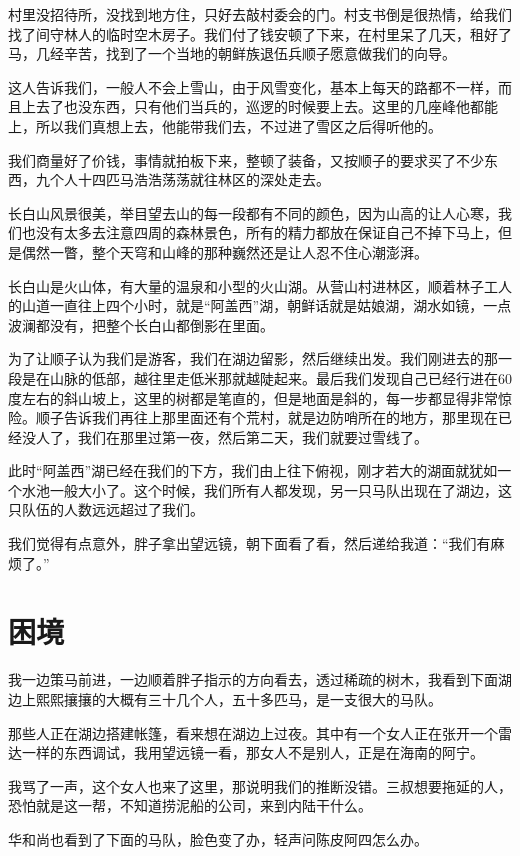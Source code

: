 村里没招待所，没找到地方住，只好去敲村委会的门。村支书倒是很热情，给我们找了间守林人的临时空木房子。我们付了钱安顿了下来，在村里呆了几天，租好了马，几经辛苦，找到了一个当地的朝鲜族退伍兵顺子愿意做我们的向导。

这人告诉我们，一般人不会上雪山，由于风雪变化，基本上每天的路都不一样，而且上去了也没东西，只有他们当兵的，巡逻的时候要上去。这里的几座峰他都能上，所以我们真想上去，他能带我们去，不过进了雪区之后得听他的。

我们商量好了价钱，事情就拍板下来，整顿了装备，又按顺子的要求买了不少东西，九个人十四匹马浩浩荡荡就往林区的深处走去。

长白山风景很美，举目望去山的每一段都有不同的颜色，因为山高的让人心寒，我们也没有太多去注意四周的森林景色，所有的精力都放在保证自己不掉下马上，但是偶然一瞥，整个天穹和山峰的那种巍然还是让人忍不住心潮澎湃。

长白山是火山体，有大量的温泉和小型的火山湖。从营山村进林区，顺着林子工人的山道一直往上四个小时，就是“阿盖西”湖，朝鲜话就是姑娘湖，湖水如镜，一点波澜都没有，把整个长白山都倒影在里面。

为了让顺子认为我们是游客，我们在湖边留影，然后继续出发。我们刚进去的那一段是在山脉的低部，越往里走低米那就越陡起来。最后我们发现自己已经行进在60度左右的斜山坡上，这里的树都是笔直的，但是地面是斜的，每一步都显得非常惊险。顺子告诉我们再往上那里面还有个荒村，就是边防哨所在的地方，那里现在已经没人了，我们在那里过第一夜，然后第二天，我们就要过雪线了。

此时“阿盖西”湖已经在我们的下方，我们由上往下俯视，刚才若大的湖面就犹如一个水池一般大小了。这个时候，我们所有人都发现，另一只马队出现在了湖边，这只队伍的人数远远超过了我们。

我们觉得有点意外，胖子拿出望远镜，朝下面看了看，然后递给我道：“我们有麻烦了。”

\chapter{困境}

我一边策马前进，一边顺着胖子指示的方向看去，透过稀疏的树木，我看到下面湖边上熙熙攘攘的大概有三十几个人，五十多匹马，是一支很大的马队。

那些人正在湖边搭建帐篷，看来想在湖边上过夜。其中有一个女人正在张开一个雷达一样的东西调试，我用望远镜一看，那女人不是别人，正是在海南的阿宁。

我骂了一声，这个女人也来了这里，那说明我们的推断没错。三叔想要拖延的人，恐怕就是这一帮，不知道捞泥船的公司，来到内陆干什么。

华和尚也看到了下面的马队，脸色变了办，轻声问陈皮阿四怎么办。

